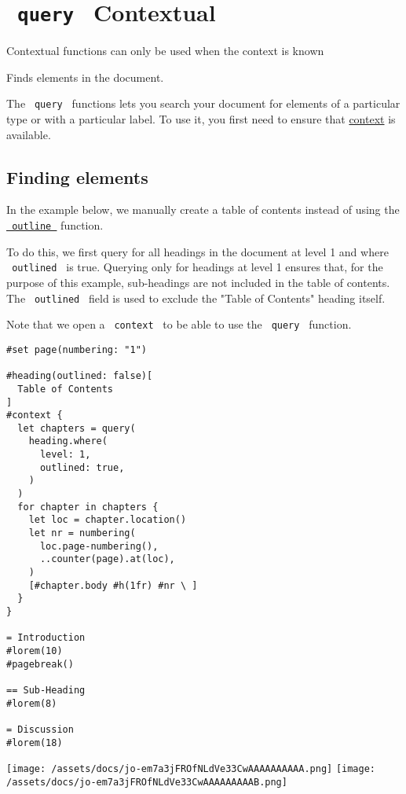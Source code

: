 \section{\texorpdfstring{\texttt{\ query\ } {{ Contextual
}}}{ query   Contextual }}\label{summary}

\label{contextual-tooltip}
Contextual functions can only be used when the context is known

Finds elements in the document.

The \texttt{\ query\ } functions lets you search your document for
elements of a particular type or with a particular label. To use it, you
first need to ensure that \href{/docs/reference/context/}{context} is
available.

\subsection{Finding elements}\label{finding-elements}

In the example below, we manually create a table of contents instead of
using the \href{/docs/reference/model/outline/}{\texttt{\ outline\ }}
function.

To do this, we first query for all headings in the document at level 1
and where \texttt{\ outlined\ } is true. Querying only for headings at
level 1 ensures that, for the purpose of this example, sub-headings are
not included in the table of contents. The \texttt{\ outlined\ } field
is used to exclude the "Table of Contents" heading itself.

Note that we open a \texttt{\ context\ } to be able to use the
\texttt{\ query\ } function.

\begin{verbatim}
#set page(numbering: "1")

#heading(outlined: false)[
  Table of Contents
]
#context {
  let chapters = query(
    heading.where(
      level: 1,
      outlined: true,
    )
  )
  for chapter in chapters {
    let loc = chapter.location()
    let nr = numbering(
      loc.page-numbering(),
      ..counter(page).at(loc),
    )
    [#chapter.body #h(1fr) #nr \ ]
  }
}

= Introduction
#lorem(10)
#pagebreak()

== Sub-Heading
#lorem(8)

= Discussion
#lorem(18)
\end{verbatim}

\texttt{[image: /assets/docs/jo-em7a3jFROfNLdVe33CwAAAAAAAAAA.png]}
\texttt{[image: /assets/docs/jo-em7a3jFROfNLdVe33CwAAAAAAAAAB.png]}

